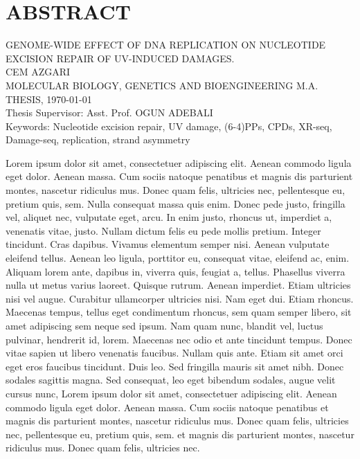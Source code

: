 \setcounter{page}{3}
\chapter*{\vspace{-4\baselineskip} \bf ABSTRACT} 

\begin{center}
\MakeUppercase{GENOME-WIDE EFFECT OF DNA REPLICATION ON
NUCLEOTIDE EXCISION REPAIR OF UV-INDUCED
DAMAGES.} \\[3\baselineskip]
\MakeUppercase{Cem Azgari} \\[\baselineskip]
MOLECULAR BIOLOGY, GENETICS AND BIOENGINEERING M.A. THESIS, \Cemdateformat\today \\[\baselineskip]
Thesis Supervisor: Asst. Prof. OGUN ADEBALI \\[2\baselineskip]
Keywords: Nucleotide excision repair, UV damage, (6-4)PPs, CPDs, XR-seq, Damage-seq,
replication, strand asymmetry \\[2\baselineskip]
\end{center}

\singlespacing
Lorem ipsum dolor sit amet, consectetuer adipiscing elit. Aenean commodo ligula eget dolor. Aenean massa. Cum sociis natoque penatibus et magnis dis parturient montes, nascetur ridiculus mus. Donec quam felis, ultricies nec, pellentesque eu, pretium quis, sem. Nulla consequat massa quis enim. Donec pede justo, fringilla vel, aliquet nec, vulputate eget, arcu. In enim justo, rhoncus ut, imperdiet a, venenatis vitae, justo. Nullam dictum felis eu pede mollis pretium. Integer tincidunt. Cras dapibus. Vivamus elementum semper nisi. Aenean vulputate eleifend tellus. Aenean leo ligula, porttitor eu, consequat vitae, eleifend ac, enim. Aliquam lorem ante, dapibus in, viverra quis, feugiat a, tellus. Phasellus viverra nulla ut metus varius laoreet. Quisque rutrum. Aenean imperdiet. Etiam ultricies nisi vel augue. Curabitur ullamcorper ultricies nisi. Nam eget dui. Etiam rhoncus. Maecenas tempus, tellus eget condimentum rhoncus, sem quam semper libero, sit amet adipiscing sem neque sed ipsum. Nam quam nunc, blandit vel, luctus pulvinar, hendrerit id, lorem. Maecenas nec odio et ante tincidunt tempus. Donec vitae sapien ut libero venenatis faucibus. Nullam quis ante. Etiam sit amet orci eget eros faucibus tincidunt. Duis leo. Sed fringilla mauris sit amet nibh. Donec sodales sagittis magna. Sed consequat, leo eget bibendum sodales, augue velit cursus nunc, Lorem ipsum dolor sit amet, consectetuer adipiscing elit. Aenean commodo ligula eget dolor. Aenean massa. Cum sociis natoque penatibus et magnis dis parturient montes, nascetur ridiculus mus. Donec quam felis, ultricies nec, pellentesque eu, pretium quis, sem. et magnis dis parturient montes, nascetur ridiculus mus. Donec quam felis, ultricies nec.

\clearpage\pagebreak
\onehalfspacing
